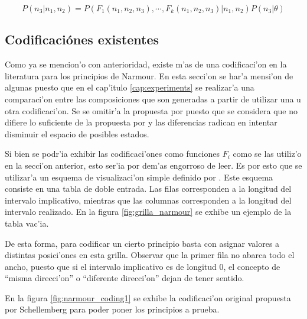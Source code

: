 $$P(n_3 | n_1, n_2) = P(F_1(n_1, n_2, n_3), \cdots, F_k(n_1, n_2, n_3)|n_1, n_2) P(n_3|\theta)$$

\subsection{Codificaci\'ones existentes}
Como ya se mencion'o con anterioridad, existe m'as de una codificaci'on en la literatura para los principios de Narmour. 
En esta secci'on se har'a mensi'on de algunas puesto que en el cap'itulo \ref{cap:experiments} se realizar'a una comparaci'on
entre las composiciones que son generadas a partir de utilizar una u otra codificaci'on. Se se omitir'a la propuesta por \cite{PaieThesis}
puesto que se considera que no difiere lo suficiente de la propuesta por \cite{Schellenberg97} y las diferencias radican en intentar disminuir
el espacio de posibles estados.


Si bien se podr'ia exhibir las codificaci'ones como funciones $F_i$ como se las utiliz'o en la secci'on anterior, esto ser'ia por dem'as engorroso de leer.
Es por esto que se utilizar'a un esquema de visualizaci'on simple definido por \cite{Narmour91}. Este esquema consiste en una tabla de doble entrada. 
Las filas corresponden a la longitud del intervalo implicativo, mientras que las columnas corresponden a la longitud del intervalo realizado.
En la figura \ref{fig:grilla_narmour} se exhibe un ejemplo de la tabla vac'ia.

\begin{imagen}
    \width{14cm}
\end{imagen}

De esta forma, para codificar un cierto principio basta con asignar valores a distintas posici'ones en esta grilla. Observar que la primer fila 
no abarca todo el ancho, puesto que si el intervalo implicativo es de longitud 0, el concepto de ``misma direcci'on'' o ``diferente direcci'on'' dejan
de tener sentido.

En la figura \ref{fig:narmour_coding1} se exhibe la codificaci'on original propuesta por Schellemberg para poder poner los principios a prueba.


\begin{imagen}
    \width{10cm}
\end{imagen}


